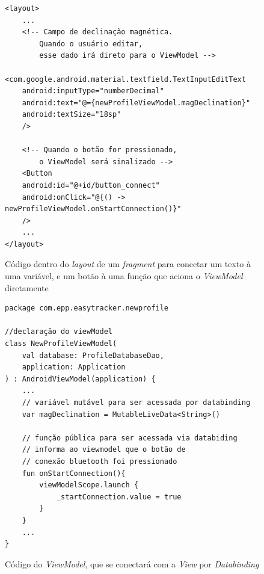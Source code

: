 \begin{figure}[!htb]
	\centering
	\caption{Código dentro do \textit{layout} de um \textit{fragment} para conectar um texto à uma variável, e um botão à uma função que aciona o \textit{ViewModel} diretamente}
	\vspace{-15pt}
	\begin{verbatim}
<layout>
	...
	<!-- Campo de declinação magnética. 
		Quando o usuário editar, 
		esse dado irá direto para o ViewModel -->
	<com.google.android.material.textfield.TextInputEditText
	android:inputType="numberDecimal"
	android:text="@={newProfileViewModel.magDeclination}"
	android:textSize="18sp"
	/>
	
	<!-- Quando o botão for pressionado, 
		o ViewModel será sinalizado -->
	<Button
	android:id="@+id/button_connect"
	android:onClick="@{() -> newProfileViewModel.onStartConnection()}"
	/>
	...
</layout>
	\end{verbatim}
	\label{code:viewmodelbutton}
	\vspace{-30pt}
\end{figure}


\begin{figure}[!htb]
	\centering
	\caption{Código do \textit{ViewModel}, que se conectará com a \textit{View} por \textit{Databinding}}
	\vspace{-15pt}
	\begin{verbatim}
package com.epp.easytracker.newprofile

//declaração do viewModel
class NewProfileViewModel(
	val database: ProfileDatabaseDao,
	application: Application
) : AndroidViewModel(application) {		
	...
	// variável mutável para ser acessada por databinding
	var magDeclination = MutableLiveData<String>()
	
	// função pública para ser acessada via databiding
	// informa ao viewmodel que o botão de
	// conexão bluetooth foi pressionado
	fun onStartConnection(){
		viewModelScope.launch {
			_startConnection.value = true
		}
	}
	...
}
	\end{verbatim}
	\label{code:viewmodel}
	\vspace{-30pt}
\end{figure}

